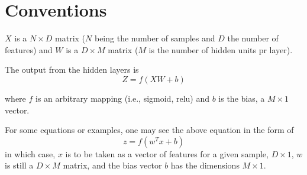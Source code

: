 \documentclass[10pt,a4paper]{article}
\begin{document}
\section{Conventions}

$X$ is a $N\times D$ matrix ($N$ being the number of samples and $D$ the number of features) and $W$ is a $D\times M$ matrix ($M$ is the number of hidden units pr layer).

The output from the hidden layers is
$$
Z = f\left( XW + b\right)
$$

where $f$ is an arbitrary mapping (i.e., sigmoid, relu) and $b$ is the bias, a $M\times 1$ vector.

For some equations or examples, one may see the above equation in the form of 
$$
z = f(w^T x + b)
$$
in which case, $x$ is to be taken as a vector of features for a given sample, $D\times 1$, $w$ is still a $D\times M$ matrix, and the bias vector $b$ has the dimensions $M\times 1$.
\end{document}
